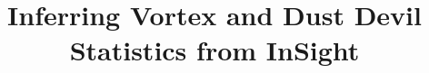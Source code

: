 \documentclass[linenumbers,trackchanges]{aastex63}
\begin{document}
\title{Inferring Vortex and Dust Devil Statistics from InSight}


\end{document}

